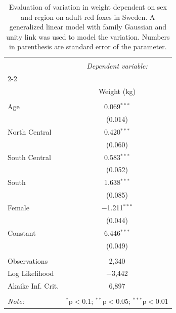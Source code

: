 \documentclass[PCJ,Unicode,screen]{cedram}
\begin{document}
\begin{table}[!htbp] 
\centering 
\captionsetup{font=scriptsize}
  \caption{Evaluation of variation in weight dependent on sex and region on adult red foxes in Sweden. A generalized linear model with family Gaussian and unity link was used to model the variation. Numbers in parenthesis are standard error of the parameter.} 
  \label{ref:Adweight} 
  \scriptsize
\begin{tabular}{@{\extracolsep{5pt}}lc} 
\\[-1.8ex]\hline 
\hline \\[-1.8ex] 
 & \multicolumn{1}{c}{\textit{Dependent variable:}} \\ 
\cline{2-2} 
\\[-1.8ex] & Weight (kg) \\ 
\hline \\[-1.8ex] 
 Age & 0.069$^{***}$ \\ 
  & (0.014) \\ 
 North Central & 0.420$^{***}$ \\ 
  & (0.060) \\ 
South Central & 0.583$^{***}$ \\ 
  & (0.052) \\ 
South & 1.638$^{***}$ \\ 
  & (0.085) \\ 
Female & $-$1.211$^{***}$ \\ 
  & (0.044) \\ 
 Constant & 6.446$^{***}$ \\ 
  & (0.049) \\ 
\hline \\[-1.8ex] 
Observations & 2,340 \\ 
Log Likelihood & $-$3,442 \\ 
Akaike Inf. Crit. & 6,897 \\ 
\hline 
\hline \\[-1.8ex] 
\textit{Note:}  & \multicolumn{1}{r}{$^{*}$p$<$0.1; $^{**}$p$<$0.05; $^{***}$p$<$0.01} \\ 
\end{tabular} 
\end{table} 
\end{document}

